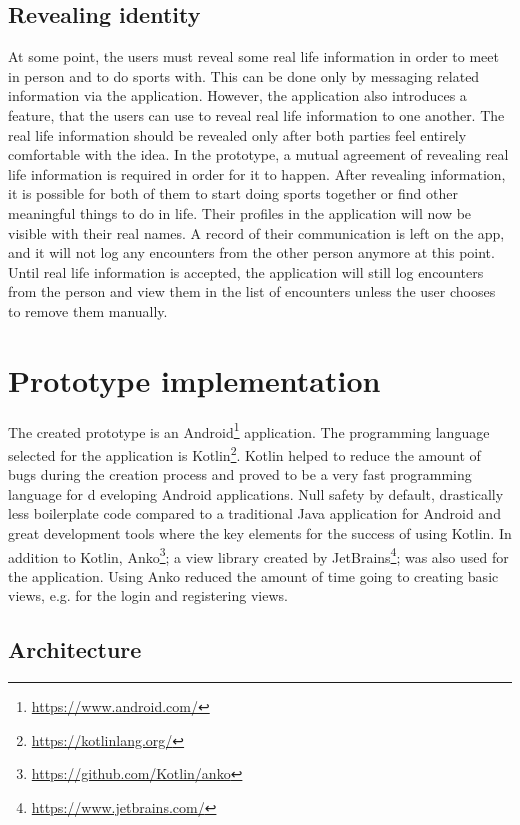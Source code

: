 \subsection{Revealing identity}

At some point, the users must reveal some real life information in order to meet in person and to do sports with. This can be done only by messaging related information via the application. However, the application also introduces a feature, that the users can use to reveal real life information to one another. The real life information should be revealed only after both parties feel entirely comfortable with the idea. In the prototype, a mutual agreement of revealing real life information is required in order for it to happen. After revealing information, it is possible for both of them to start doing sports together or find other meaningful things to do in life. Their profiles in the application will now be visible with their real names. A record of their communication is left on the app, and it will not log any encounters from the other person anymore at this point. Until real life information is accepted, the application will still log encounters from the person and view them in the list of encounters unless the user chooses to remove them manually.
\clearpage
\section{Prototype implementation}

The created prototype is an Android\footnote{\url{https://www.android.com/}} application. The programming language selected for the application is Kotlin\footnote{\url{https://kotlinlang.org/}}. Kotlin helped to reduce the amount of bugs during the creation process and proved to be a very fast programming language for d	eveloping Android applications. Null safety by default, drastically less boilerplate code compared to a traditional Java application for Android and great development tools where the key elements for the success of using Kotlin. In addition to Kotlin, Anko\footnote{\url{https://github.com/Kotlin/anko}}; a view library created by JetBrains\footnote{\url{https://www.jetbrains.com/}}; was also used for the application. Using Anko reduced the amount of time going to creating basic views, e.g. for the login and registering views.

\subsection{Architecture}

